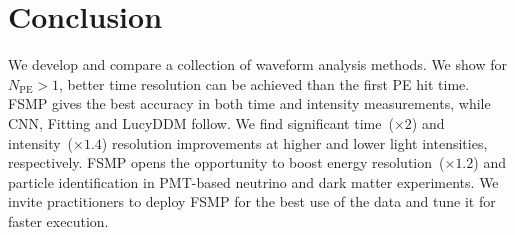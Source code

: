\section{Conclusion}
\label{sec:conclusion}

We develop and compare a collection of waveform analysis methods.  We show for $N_\mathrm{PE} > 1$, better time resolution can be achieved than the first PE hit time.  FSMP gives the best accuracy in both time and intensity measurements, while CNN, Fitting and LucyDDM follow.  We find significant time~($\times 2$) and intensity~($\times 1.4$) resolution improvements at higher and lower light intensities, respectively.    FSMP opens the opportunity to boost energy resolution~($\times 1.2$) and particle identification in PMT-based neutrino and dark matter experiments.  We invite practitioners to deploy FSMP for the best use of the data and tune it for faster execution.
